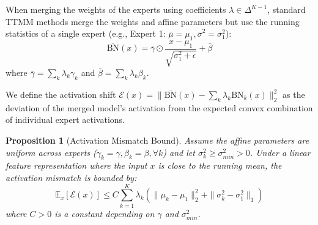 \documentclass{article}
\newtheorem{proposition}{Proposition}
\begin{document}
When merging the weights of the experts using coefficients $\lambda \in \Delta^{K-1}$, standard TTMM methods merge the weights and affine parameters but use the running statistics of a single expert (e.g., Expert 1: $\bar{\mu} = \mu_1, \bar{\sigma}^2 = \sigma_1^2$):
\begin{equation}
\overline{\text{BN}}(x) = \bar{\gamma} \odot \frac{x - \mu_1}{\sqrt{\sigma_1^2 + \epsilon}} + \bar{\beta}
\end{equation}
where $\bar{\gamma} = \sum_k \lambda_k \gamma_k$ and $\bar{\beta} = \sum_k \lambda_k \beta_k$.

We define the activation shift $\mathcal{E}(x) = \|\overline{\text{BN}}(x) - \sum_k \lambda_k \text{BN}_k(x)\|_2^2$ as the deviation of the merged model's activation from the expected convex combination of individual expert activations.

\begin{proposition}[Activation Mismatch Bound]
Assume the affine parameters are uniform across experts ($\gamma_k = \gamma, \beta_k = \beta, \forall k$) and let $\sigma_k^2 \geq \sigma_{min}^2 > 0$. Under a linear feature representation where the input $x$ is close to the running mean, the activation mismatch is bounded by:
\begin{equation}
\mathbb{E}_x[\mathcal{E}(x)] \leq C \sum_{k=1}^K \lambda_k \left( \|\mu_k - \mu_1\|_2^2 + \|\sigma_k^2 - \sigma_1^2\|_1 \right)
\end{equation}
where $C > 0$ is a constant depending on $\gamma$ and $\sigma_{min}^2$.
\end{proposition}
\end{document}
